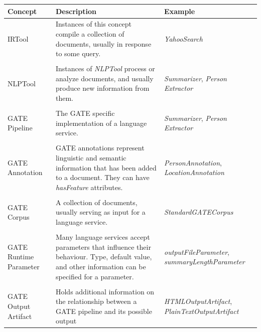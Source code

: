 \begin{table}[tb]
\centering\small\sffamily
\begin{tabular}{p{}@{\hspace*{4mm}}p{}@{\hspace*{4mm}}p{}}
  \toprule 
  \textbf{Concept}&\textbf{Description} &\textbf{Example} \\
  \midrule

  IRTool & Instances of this concept compile a collection of
  documents, usually in response to some query.  & \emph{YahooSearch}
  \\

   & & \\

  NLPTool & Instances of \emph{NLPTool} process or analyze documents,
  and usually produce new information from them. & \emph{Summarizer},
    \emph{Person Extractor} \\

   & & \\

  GATE Pipeline & The GATE specific implementation of a language
  service.  & \emph{Summarizer}, \emph{Person Extractor} \\

   & & \\

  GATE Annotation & GATE annotations represent linguistic and semantic
  information that has been added to a document. They can have
  \emph{hasFeature} attributes. & \emph{PersonAnnotation},
  \emph{LocationAnnotation}  \\

   & & \\

  GATE Corpus & A collection of documents, usually serving as input
  for a language service.  & \emph{StandardGATECorpus} \\

   & & \\

  GATE Runtime Parameter & Many language services accept parameters
  that influence their behaviour. Type, default value, and other
  information can be specified for a parameter.  &
  \emph{outputFileParameter}, \emph{summaryLengthParameter} \\

   & & \\

  GATE Output Artifact & Holds additional information on the
  relationship between a GATE pipeline and its possible output &
  \emph{HTMLOutputArtifact}, \emph{PlainTextOutputArtifact}  \\


\end{tabular}
\end{table}
